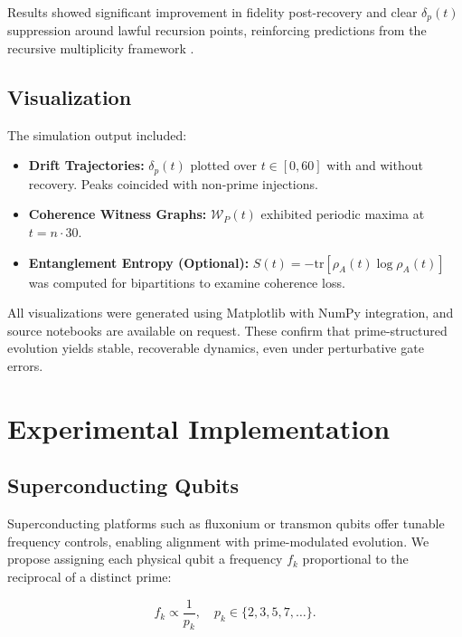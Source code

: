 \documentclass[12]{amsart}
\theoremstyle{plain}
\begin{document}
Results showed significant improvement in fidelity post-recovery and clear $\delta_p(t)$ suppression around lawful recursion points, reinforcing predictions from the recursive multiplicity framework \cite{multiplicities_of_multiplicity}.

\subsection{Visualization}

The simulation output included:

\begin{itemize}
    \item \textbf{Drift Trajectories:} $\delta_p(t)$ plotted over $t \in [0, 60]$ with and without recovery. Peaks coincided with non-prime injections.

    \item \textbf{Coherence Witness Graphs:} $\mathcal{W}_P(t)$ exhibited periodic maxima at $t = n \cdot 30$.

    \item \textbf{Entanglement Entropy (Optional):} $S(t) = -\text{tr}[\rho_A(t) \log \rho_A(t)]$ was computed for bipartitions to examine coherence loss.

\end{itemize}

All visualizations were generated using Matplotlib with NumPy integration, and source notebooks are available on request. These confirm that prime-structured evolution yields stable, recoverable dynamics, even under perturbative gate errors.

\section{Experimental Implementation}

\subsection{Superconducting Qubits}

Superconducting platforms such as fluxonium or transmon qubits offer tunable frequency controls, enabling alignment with prime-modulated evolution. We propose assigning each physical qubit a frequency $f_k$ proportional to the reciprocal of a distinct prime:

\begin{equation}
f_k \propto \frac{1}{p_k}, \quad p_k \in \{2, 3, 5, 7, \dots\}.
\end{equation}
\end{document}
